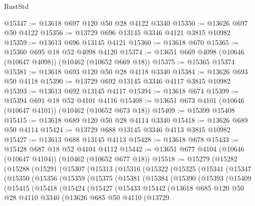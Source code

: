 \begin{lexlean}{RustStd}
\begin{coremodule}
@15347 := @13618 @697 @120 @50 @28 @4122 @3340
@15350 := @13626 @697 @50 @4122
@15356 := @13729 @696 @13145 @3346 @4121 @3815 @10982
@15359 := @13613 @696 @13145 @4121
@15360 := @13618 @670
@15365 := @15360 @695 @18 @52 @4098 @4120
@15374 := @13651 @669 @4098 (@10646 (@10647 @4098)) (@10462 (@10652 @669 @18))
@15375 := @15365 @15374
@15381 := @13618 @693 @120 @50 @28 @4118 @3340
@15384 := @13626 @693 @50 @4118
@15390 := @13729 @692 @13145 @3346 @4117 @3815 @10982
@15393 := @13613 @692 @13145 @4117
@15394 := @13618 @674
@15399 := @15394 @691 @18 @52 @4101 @4116
@15408 := @13651 @673 @4101 (@10646 (@10647 @4101)) (@10462 (@10652 @673 @18))
@15409 := @15399 @15408
@15415 := @13618 @689 @120 @50 @28 @4114 @3340
@15418 := @13626 @689 @50 @4114
@15424 := @13729 @688 @13145 @3346 @4113 @3815 @10982
@15427 := @13613 @688 @13145 @4113
@15428 := @13618 @678
@15433 := @15428 @687 @18 @52 @4104 @4112
@15442 := @13651 @677 @4104 (@10646 (@10647 @4104)) (@10462 (@10652 @677 @18))
@15518 := @15279
    (@15282
      (@15288
        (@15291
          (@15307
            (@15313
              (@15316
                (@15322
                  (@15325
                    (@15341
                      (@15347
                        (@15350
                          (@15356
                            (@15359
                              (@15375
                                (@15381
                                  (@15384
                                    (@15390
                                      (@15393
                                        (@15409
                                          (@15415
                                            (@15418
                                              (@15424
                                                (@15427
                                                  (@15433
                                                    @15442
                                                    (@13618
                                                      @685
                                                      @120
                                                      @50
                                                      @28
                                                      @4110
                                                      @3340
                                                      (@13626
                                                        @685
                                                        @50
                                                        @4110
                                                        (@13729

\end{coremodule}
\end{lexlean}
